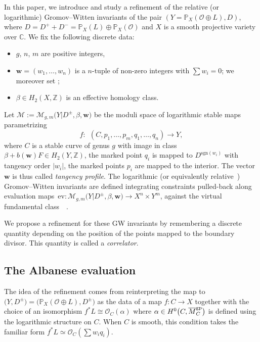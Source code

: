 \documentclass[pdftex]{sigma}
\newcommand{\vir}[1]{\big[#1\big]^\mathrm{vir}}
\newcommand{\ev}{\mathrm{ev}}
\newcommand{\PP}{\mathbb{P}}
\newcommand{\ZZ}{\mathbb{Z}}
\newcommand{\bfw}{ {\boldsymbol w} }
\newcommand{\M}{\mathcal{M}}
\renewcommand{\O}{\mathcal{O}}
\renewcommand{\bar}{\overline}
\numberwithin{equation}{section}
\theoremstyle{definition}
\begin{document}
In this paper, we introduce and study a refinement of the relative (or logarithmic) Gromov--Witten invariants \cite{abramovich2014stable,gross2013logarithmic,kim2010logarithmic,li2001stable} of the pair $(Y=\PP_X(\O\oplus L),D)$, where $D=D^+ + D^-=\PP_X(L)\oplus\PP_X(\O)$ and $X$ is a smooth projective variety over $\mathbb C$. We fix the following discrete data:
\begin{itemize}\itemsep=0pt
 \item $g$, $n$, $m$ are positive integers,
 \item $\bfw=(w_1,\dots,w_n)$ is a $n$-tuple of non-zero integers with $\sum w_i=0$; we moreover set \smash{$b(\bfw)=\sum_{w_i>0}w_i=-\sum_{w_i<0}w_i$};
 \item $\beta\in H_2(X,\ZZ)$ is an effective homology class.
\end{itemize}
Let $\M:=\M_{g,m}\bigl(Y|D^{\pm},\beta,\bfw\bigr)$ be the moduli space of logarithmic stable maps parametrizing
\[
f\colon\ \ (C,p_1,\dots,p_m,q_1,\dots,q_n)\to Y,
 \]
where $C$ is a stable curve of genus $g$ with image in class $\beta+b(\bfw)F\in H_2(Y,\ZZ)$, the marked point $q_i$ is mapped to $D^{\mathrm{sgn}(w_i)}$ with tangency order $|w_i|$, the marked points $p_i$ are mapped to the interior. The vector $\bfw$ is thus called \textit{tangency profile}.
The logarithmic (or equivalently relative~\cite{abramovich2014comparison}) Gromov--Witten invariants are defined integrating constraints pulled-back along evaluation maps~${
\ev \colon \M_{g,m}\bigl(Y|D^{\pm},\beta,\bfw\bigr) \longrightarrow X^n\times Y^m}$,
 against the virtual fundamental class~\smash{$\vir{\M}$}~\cite{gross2013logarithmic}.

 We propose a refinement for these GW invariants by remembering a discrete quantity depending on the position of the points mapped to the boundary divisor. This quantity is called a \textit{correlator}.

\subsection{The Albanese evaluation}
The idea of the refinement comes from reinterpreting the map to $\bigl(Y, D^\pm\bigr)=\bigl(\PP_X(\O\oplus L), D^\pm\bigr)$ as the data of a map $f\colon C\to X$ together with the choice of an isomorphism $f^*L\cong\O_C(\alpha)$ where $\alpha\in H^0\bigl(C,\bar{M}_C^{\rm gp}\bigr)$ is defined using the logarithmic structure on $C$. When $C$ is smooth, this condition takes the familiar form $f^*L\simeq\O_C(\sum w_i q_i)$.
\end{document}
